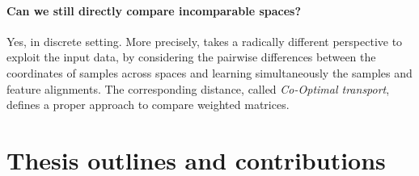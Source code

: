 
\paragraph{Can we still \textbf{directly} compare \textbf{incomparable spaces}?} Yes,
in discrete setting. More precisely, \citep{Redko20} takes a radically different perspective
to exploit the input data, by considering the pairwise differences between the coordinates
of samples across spaces and learning simultaneously the samples and feature alignments.
The corresponding distance, called \textit{Co-Optimal transport}, defines a proper approach
to compare weighted matrices.

\section{Thesis outlines and contributions}

